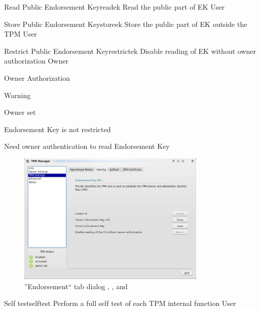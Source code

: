 \documentclass[
  american        %
]{sirrixreport}
\begin{document}
\begin{usecase}{Read Public Endorsement Key}{readek}
\uctitle Read the public part of EK
\ucactors  User
\end{usecase}

\begin{usecase}{Store Public Endorsement Key}{storeek}
\uctitle Store the public part of EK outside the TPM
\ucactors  User
\end{usecase}

\begin{usecase}{Restrict Public Endorsement Key}{restrictek}
\ucdesc Disable reading of EK without owner authorization
\ucactors  Owner
\ucinclude
  \begin{compactitem}
      \item Owner Authorization 
      \item Warning 
   \end{compactitem}
\ucprecond 
   \begin{compactitem}
      \item Owner set
      \item Endorsement Key is not restricted
   \end{compactitem}
\ucpostcond Need owner authentication to read Endorsement Key
\end{usecase}
\clearpage

\begin{figure}[h]
 \centering
 \includegraphics[width=0.8\textwidth]{images/tpm_identity}
 \caption{''Endorsement`` tab dialog , ,  and  }
\end{figure}
\clearpage

\begin{usecase}{Self test}{selftest}
\ucdesc Perform a full self test of each TPM internal function
\ucactors  User
\end{usecase}
\end{document}
